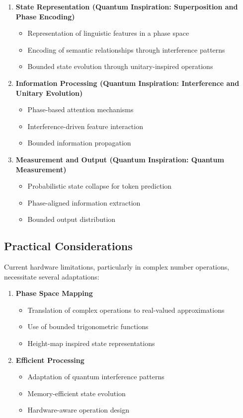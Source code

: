 \documentclass[twocolumn]{article}
\begin{document}
\begin{enumerate}
    \item \textbf{State Representation (Quantum Inspiration: Superposition and Phase Encoding)}
    \begin{itemize}
        \item Representation of linguistic features in a phase space
        \item Encoding of semantic relationships through interference patterns
        \item Bounded state evolution through unitary-inspired operations
    \end{itemize}

    \item \textbf{Information Processing (Quantum Inspiration: Interference and Unitary Evolution)}
    \begin{itemize}
        \item Phase-based attention mechanisms
        \item Interference-driven feature interaction
        \item Bounded information propagation
    \end{itemize}

    \item \textbf{Measurement and Output (Quantum Inspiration: Quantum Measurement)}
    \begin{itemize}
        \item Probabilistic state collapse for token prediction
        \item Phase-aligned information extraction
        \item Bounded output distribution
    \end{itemize}
\end{enumerate}

\subsection{Practical Considerations}
Current hardware limitations, particularly in complex number operations, necessitate several adaptations:

\begin{enumerate}
    \item \textbf{Phase Space Mapping}
    \begin{itemize}
        \item Translation of complex operations to real-valued approximations
        \item Use of bounded trigonometric functions
        \item Height-map inspired state representations
    \end{itemize}

    \item \textbf{Efficient Processing}
    \begin{itemize}
        \item Adaptation of quantum interference patterns
        \item Memory-efficient state evolution
        \item Hardware-aware operation design
    \end{itemize}
\end{enumerate}
\end{document}
